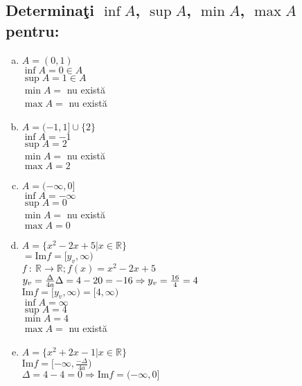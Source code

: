\documentclass[a4paper, 12pt, notitlepage]{book}
\begin{document}
    \subsection{Determina\c{t}i $\inf A$, $\sup A$, $\min A$, $\max A$ pentru:}
    \begin{enumerate}[a.]
      \item $A = (0,1)$\\
            $\inf A = 0 \in A$\\
            $\sup A = 1 \in A$\\
            $\min A =$ nu exist\u{a}\\
            $\max A =$ nu exist\u{a}

      \item $A = (-1, 1] \cup \{2\} $\\
            $\inf A = -1$\\
            $\sup A = 2$\\
            $\min A =$ nu exist\u{a}\\
            $\max A = 2$

      \item $A = (-\infty, 0]$\\
            $\inf A = -\infty$\\
            $\sup A = 0$\\
            $\min A =$ nu exist\u{a}\\
            $\max A = 0$

      \item $A = \{x^{2} - 2x +5 \vert x \in \mathbb{R}\}$\\
            $= \text{Im} f=[y_{v}, \infty)$\\
            $f\ :\ \mathbb{R} \to \mathbb{R}; f(x) = x^{2} - 2x +5$\\
            $y_{v} = \frac{\Delta}{4a}\\
            \Delta = 4-20 = -16 \Rightarrow y_{v} = \frac{16}{4} = 4$\\

            $\text{Im} f=[y_{v}, \infty) = [4, \infty)$\\

            $\inf A = \infty$\\
            $\sup A = 4$\\
            $\min A = 4$ \\
            $\max A = $ nu exist\u{a}

      \item $A = \{x^{2} + 2x - 1 \vert x \in \mathbb{R}\}$\\
            $\text{Im} f=[-\infty, \frac{-\Delta}{4a})$\\
            $\Delta = 4-4 = 0 \Rightarrow \text{Im} f=(-\infty, 0]$


\end{enumerate}
\end{document}
